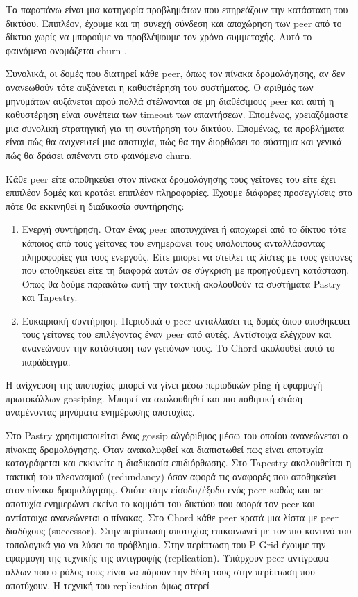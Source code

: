 Τα παραπάνω είναι μια κατηγορία προβλημάτων που επηρεάζουν την κατάσταση 
του δικτύου. Επιπλέον, έχουμε και τη συνεχή σύνδεση και αποχώρηση των 
peer από το δίκτυο χωρίς να μπορούμε να προβλέψουμε τον χρόνο 
συμμετοχής. Αυτό το φαινόμενο ονομάζεται churn \citep{Buford2009}. 

Συνολικά, οι δομές που διατηρεί κάθε peer, όπως τον πίνακα δρομολόγησης, 
αν δεν ανανεωθούν τότε αυξάνεται η καθυστέρηση του συστήματος. Ο αριθμός 
των μηνυμάτων αυξάνεται αφού πολλά στέλνονται σε μη διαθέσιμους peer και 
αυτή η καθυστέρηση είναι συνέπεια των timeout των απαντήσεων. Επομένως, 
χρειαζόμαστε μια συνολική στρατηγική για τη συντήρηση του δικτύου. 
Επομένως, τα προβλήματα είναι πώς θα ανιχνευτεί μια αποτυχία, πώς θα την 
διορθώσει το σύστημα και γενικά πώς θα δράσει απέναντι στο φαινόμενο 
churn.

Κάθε peer είτε αποθηκεύει στον πίνακα δρομολόγησης τους γείτονες του 
είτε έχει επιπλέον δομές και κρατάει επιπλέον πληροφορίες. Έχουμε 
διάφορες προσεγγίσεις στο πότε θα εκκινηθεί η διαδικασία συντήρησης:

\begin{enumerate}
\item Ενεργή συντήρηση. Όταν ένας peer αποτυγχάνει ή αποχωρεί από το 
δίκτυο τότε κάποιος από τους γείτονες του ενημερώνει τους υπόλοιπους 
ανταλλάσοντας πληροφορίες για τους ενεργούς. Είτε μπορεί να στείλει τις 
λίστες με τους γείτονες που αποθηκεύει είτε τη διαφορά αυτών σε σύγκριση 
με προηγούμενη κατάσταση. Όπως θα δούμε παρακάτω αυτή την τακτική 
ακολουθούν τα συστήματα Pastry και Tapestry.
\item Ευκαιριακή συντήρηση. Περιοδικά ο peer ανταλλάσει τις δομές όπου 
αποθηκεύει τους γείτονες του επιλέγοντας έναν peer από αυτές. Αντίστοιχα 
ελέγχουν και ανανεώνουν την κατάσταση των γειτόνων τους. Το Chord 
ακολουθεί αυτό το παράδειγμα.
\end{enumerate}

Η ανίχνευση της αποτυχίας μπορεί να γίνει μέσω περιοδικών ping ή 
εφαρμογή πρωτοκόλλων gossiping. Μπορεί να ακολουθηθεί και πιο παθητική 
στάση αναμένοντας μηνύματα ενημέρωσης αποτυχίας.

Στο Pastry \citep{Pastry} χρησιμοποιείται ένας gossip αλγόριθμος μέσω 
του οποίου ανανεώνεται ο πίνακας δρομολόγησης. Όταν ανακαλυφθεί και 
διαπιστωθεί πως είναι αποτυχία καταγράφεται και εκκινείτε η διαδικασία 
επιδιόρθωσης. Στο Tapestry \citep{Tapestry} ακολουθείται η τακτική του 
πλεονασμού (redundancy) όσον αφορά τις αναφορές που αποθηκεύει στον 
πίνακα δρομολόγησης. Οπότε στην είσοδο/έξοδο ενός peer καθώς και σε 
αποτυχία ενημερώνει εκείνο το κομμάτι του δικτύου που αφορά τον peer και 
αντίστοιχα ανανεώνεται ο πίνακας. Στο Chord \citep{Chord} κάθε peer 
κρατά μια λίστα με peer διαδόχους (successor). Στην περίπτωση αποτυχίας 
επικοινωνεί με τον πιο κοντινό του τοπολογικά για να λύσει το πρόβλημα. 
Στην περίπτωση του P-Grid έχουμε την εφαρμογή της τεχνικής της 
αντιγραφής (replication). Υπάρχουν peer αντίγραφα άλλων που ο ρόλος τους 
είναι να πάρουν την θέση τους στην περίπτωση που αποτύχουν. 
Η τεχνική του replication όμως στερεί

